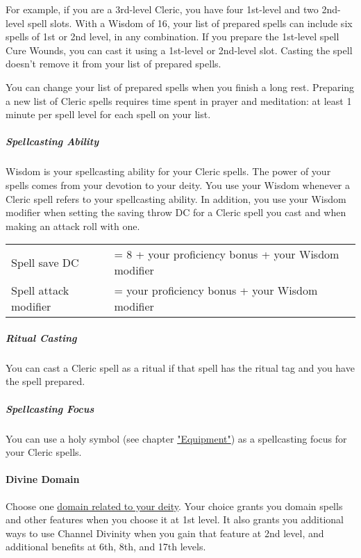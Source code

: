 For example, if you are a 3rd-level Cleric, you have four 1st-level and
two 2nd-level spell slots. With a Wisdom of 16, your list of prepared
spells can include six spells of 1st or 2nd level, in any combination.
If you prepare the 1st-level spell Cure Wounds, you can cast it using a
1st-level or 2nd-level slot. Casting the spell doesn't remove it from
your list of prepared spells.

You can change your list of prepared spells when you finish a long rest.
Preparing a new list of Cleric spells requires time spent in prayer and
meditation: at least 1 minute per spell level for each spell on your
list.

\subparagraph{Spellcasting Ability}\label{_spellcasting_ability}

Wisdom is your spellcasting ability for your Cleric spells. The power of
your spells comes from your devotion to your deity. You use your Wisdom
whenever a Cleric spell refers to your spellcasting ability. In
addition, you use your Wisdom modifier when setting the saving throw DC
for a Cleric spell you cast and when making an attack roll with one.

\begin{longtable}[]{@{}
  >{\raggedright\arraybackslash}p{}
  >{\raggedright\arraybackslash}p{}@{}}
\toprule\noalign{}
\endhead
\bottomrule\noalign{}
\endlastfoot
Spell save DC & = 8 + your proficiency bonus + your Wisdom modifier \\
Spell attack modifier & = your proficiency bonus + your Wisdom
modifier \\
\end{longtable}

\subparagraph{Ritual Casting}\label{_ritual_casting}

You can cast a Cleric spell as a ritual if that spell has the ritual tag
and you have the spell prepared.

\subparagraph{Spellcasting Focus}\label{_spellcasting_focus}

You can use a holy symbol (see chapter
\hyperref[equipment]{"Equipment"}) as a spellcasting focus for your
Cleric spells.

\paragraph{Divine Domain}\label{cleric-feature-divine-domain}

Choose one \hyperref[cleric-subclasses]{domain related to your deity}.
Your choice grants you domain spells and other features when you choose
it at 1st level. It also grants you additional ways to use Channel
Divinity when you gain that feature at 2nd level, and additional
benefits at 6th, 8th, and 17th levels.

